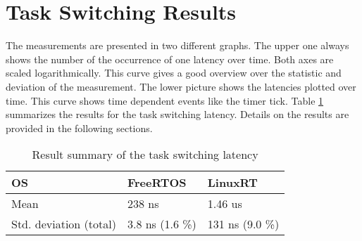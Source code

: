 \section{Task Switching Results}\label{s_task_switching_results}
The measurements are presented in two different graphs. 
The upper one always shows the number of the occurrence of one latency over time. 
Both axes are scaled logarithmically. 
This curve gives a good overview over the statistic and deviation of the measurement.
The lower picture shows the latencies plotted over time. 
This curve shows time dependent events like the timer tick.  
Table \ref{tab_summary_task_switching} summarizes the results for the task switching latency.
Details on the results are provided in the following sections.

\begin{table}[htbp]
	\centering
		\begin{tabular}{|l||l|l|}
			\hline
				OS 											& FreeRTOS	& LinuxRT  \\
				\hline 
				Mean  										& 238 ns		& 1.46 us  \\
			  \hline
			  Std. deviation (total)	  & 3.8 ns (1.6 \%)		& 131 ns (9.0 \%)		  \\
			\hline
		\end{tabular}
	\caption{Result summary of the task switching latency}
	\label{tab_summary_task_switching}
\end{table}

